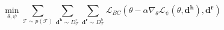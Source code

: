 \begin{equation}
 \label{eq:daml}
 \underset{\theta,\psi}{\min} \sum_{\mathcal{T} \sim p(\mathcal{T})} \sum_{\mathbf{d^h} \sim D^{r}_{\mathcal{T}}} \sum_{\mathbf{d^r} \sim D^{h}_{\mathcal{T}}} \mathcal{L}_{BC}(\theta - \alpha \nabla_\theta\mathcal{L}_{\psi}(\theta,\mathbf{d^{h}}), \mathbf{d^{r}})
\end{equation}